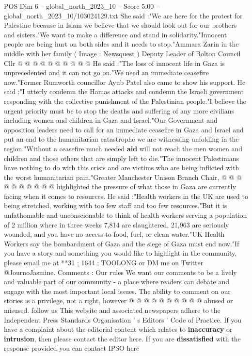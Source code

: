 \begin{textsample}{POS Dim 6 – global\_north\_2023\_10 – Score 5.00 – global\_north\_2023\_10/103024129.txt}
She said :"We are here for the protest for Palestine because in Islam we believe that we should look out for our brothers and sisters."We want to make a difference and stand in solidarity."Innocent people are being hurt on both sides and it needs to stop."Ammara Zarin in the middle with her family ( Image : Newsquest ) Deputy Leader of Bolton Council Cllr @ @ @ @ @ @ @ @ @ @ He said :"The loss of innocent life in Gaza is unprecedented and it can not go on."We need an immediate ceasefire now."Former Rumworth councillor Ayub Patel also came to show his support.
He said :"I utterly condemn the Hamas attacks and condemn the Israeli government responding with the collective punishment of the Palestinian people."I believe the urgent priority must be to stop the deaths and suffering of any more civilians including women and children in Gaza and Israel."Our Government and opposition leaders need to call for an immediate ceasefire in Gaza and Israel and put an end to the humanitarian catastrophe we are witnessing unfolding in the region."Without a ceasefire much needed \textbf{aid} will not reach the men women and children and those others that are simply left to die."The innocent Palestinians have nothing to do with this crisis and are victims who are being inflicted with the worst humanitarian pain."Greater Manchester Unison Branch Chair, @ @ @ @ @ @ @ @ @ @ highlighted the pressure of what those in Gaza are currently facing when it comes to resources.
He said :"Health workers in the UK are used to being stretched, working with too few staff and too few resources."But it is unfathomable and unconscionable to think of health workers serving a population of 2 million where in three weeks 7,814 are slaughtered, 21,963 are seriously wounded, and you have no access to food, fuel, or clean water."UK Health Workers say the bombardment of Gaza and the siege of Gaza must end now."If you have a story and something you would like to highlight in the community, please email me at **31 ; 1644 ; TOOLONG or DM me on Twitter @JournoJasmine.
Comments : Our rules We want our comments to be a lively and valuable part of our community - a place where readers can debate and engage with the most important local issues.
The ability to comment on our stories is a privilege, not a right, however @ @ @ @ @ @ @ @ @ @ abused or misused. follow us This website and associated newspapers adhere to the Independent Press Standards Organisation ' s Editors ' Code of Practice.
If you have a complaint about the editorial content which relates to \textbf{inaccuracy} or \textbf{intrusion}, then please contact the editor here.
If you are \textbf{dissatisfied} with the response provided you can contact IPSO here

\end{textsample}
